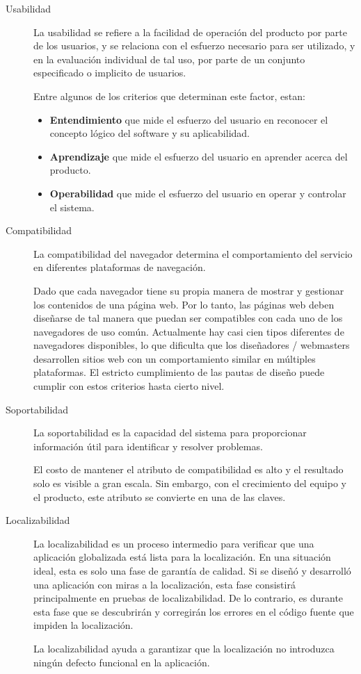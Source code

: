 \begin{description}
\item [Usabilidad] La usabilidad se refiere a la facilidad de operación del
    producto por parte de los usuarios, y se relaciona con el esfuerzo
    necesario para ser utilizado, y en la evaluación individual de tal uso, por
    parte de un conjunto especificado o implicito de usuarios.

    Entre algunos de los criterios que determinan este factor, estan:

    \begin{itemize}
    \item \textbf{Entendimiento} que mide el esfuerzo del usuario en reconocer el
        concepto lógico del software y su aplicabilidad.
    \item \textbf{Aprendizaje} que mide el esfuerzo del usuario en aprender
        acerca del producto.
    \item \textbf{Operabilidad} que mide el esfuerzo del usuario en operar y
        controlar el sistema.
    \end{itemize}

\item [Compatibilidad] La compatibilidad del navegador determina el
    comportamiento del servicio en diferentes plataformas de navegación.

    Dado que cada navegador tiene su propia manera de mostrar y gestionar los
    contenidos de una página web. Por lo tanto, las páginas web deben diseñarse
    de tal manera que puedan ser compatibles con cada uno de los navegadores de
    uso común. Actualmente hay casi cien tipos diferentes de navegadores
    disponibles, lo que dificulta que los diseñadores / webmasters desarrollen
    sitios web con un comportamiento similar en múltiples plataformas. El
    estricto cumplimiento de las pautas de diseño puede cumplir con estos
    criterios hasta cierto nivel.

\item [Soportabilidad] La soportabilidad es la capacidad del sistema para
    proporcionar información útil para identificar y resolver problemas.

    El costo de mantener el atributo de compatibilidad es alto y el resultado
    solo es visible a gran escala. Sin embargo, con el crecimiento del equipo y
    el producto, este atributo se convierte en una de las claves\cite{Ashanin}.

\item [Localizabilidad] La localizabilidad es un proceso intermedio para
    verificar que una aplicación globalizada está lista para la localización.
    En una situación ideal, esta es solo una fase de garantía de calidad. Si se
    diseñó y desarrolló una aplicación con miras a la localización, esta fase
    consistirá principalmente en pruebas de localizabilidad. De lo contrario, es
    durante esta fase que se descubrirán y corregirán los errores en el código
    fuente que impiden la localización.

    La localizabilidad ayuda a garantizar que la localización no introduzca
    ningún defecto funcional en la aplicación\cite{Moura}.
\end{description}

